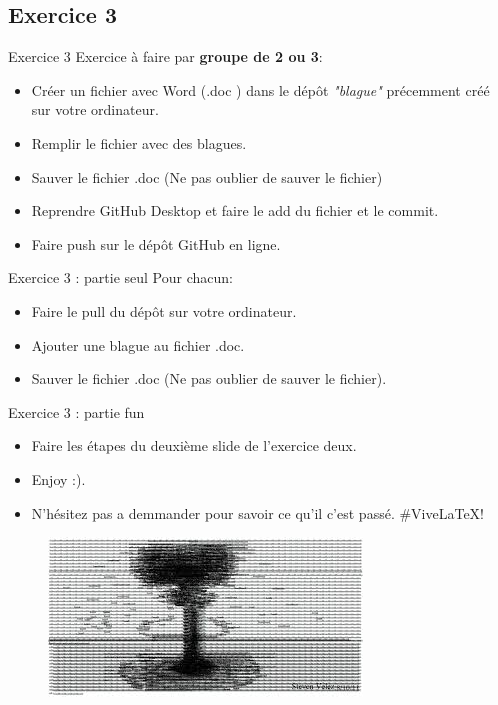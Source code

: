 \documentclass{beamer}
\begin{document}
\subsection{Exercice 3}
\begin{frame}{Exercice 3}
    Exercice à faire par \textbf{groupe de 2 ou 3}:
    \begin{itemize}
        \item Créer un fichier avec Word (.doc ) dans le dépôt \textit{"blague"} précemment créé sur votre ordinateur.
        \item Remplir le fichier avec des blagues.
        \item Sauver le fichier .doc (Ne pas oublier de sauver le fichier)
        \item Reprendre GitHub Desktop et faire le add du fichier et le commit.
        \item Faire push sur le dépôt GitHub en ligne.
    \end{itemize}
\end{frame}

\begin{frame}{Exercice 3 : partie seul}
    Pour chacun:
    \begin{itemize}
    \item Faire le pull du dépôt sur votre ordinateur.
    \item Ajouter une blague au fichier .doc.
    \item Sauver le fichier .doc (Ne pas oublier de sauver le fichier).
    \end{itemize}
\end{frame}

\begin{frame}{Exercice 3 : partie fun}
    \begin{itemize}
        \item Faire les étapes du deuxième slide de l'exercice deux.
        \item Enjoy :). 
        \item N'hésitez pas a demmander pour savoir ce qu'il c'est passé. \#ViveLaTeX!
    \end{itemize}
    \begin{figure}
    \centering
    \includegraphics[width=.7\textwidth]{img/image_exercices/explosion.jpeg}
    \end{figure}
\end{frame}
\end{document}

